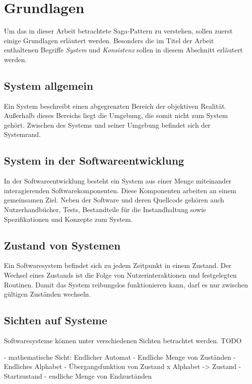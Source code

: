 \section{Grundlagen}

Um das in dieser Arbeit betrachtete Saga-Pattern zu verstehen, sollen zuerst einige Grundlagen erläutert werden. Besonders die im Titel der Arbeit enthaltenen Begriffe \textit{System} und \textit{Konsistenz} sollen in diesem Abschnitt erläutert werden. 

\subsection{System allgemein}
Ein System beschreibt einen abgegrenzten Bereich der objektiven Realität. Außerhalb dieses Bereichs liegt die Umgebung, die somit nicht zum System gehört. Zwischen des Systems und seiner Umgebung befindet sich der Systemrand. 

\subsection{System in der Softwareentwicklung}
In der Softwareentwicklung besteht ein System aus einer Menge miteinander interagierenden Softwarekomponenten. Diese Komponenten arbeiten an einem gemeinsamen Ziel. Neben der Software und deren Quellcode gehören auch Nutzerhandbücher, Tests, Bestandteile für die Instandhaltung sowie Spezifikationen und Konzepte zum System. 

\subsection{Zustand von Systemen}
Ein Softwaresystem befindet sich zu jedem Zeitpunkt in einem Zustand. Der Wechsel eines Zustands ist die Folge von Nutzerinteraktionen und festgelegten Routinen. Damit das System reibungslos funktionieren kann, darf es nur zwischen gültigen Zuständen wechseln. %

\subsection{Sichten auf Systeme}
Softwaresysteme können unter verschiedenen Sichten betrachtet werden. TODO


- mathematische Sicht: Endlicher Automat
- Endliche Menge von Zuständen
- Endliches Alphabet
- Übergangsfunktion von Zustand x Alphabet -> Zustand
- Startzustand
- endliche Menge von Endzuständen

